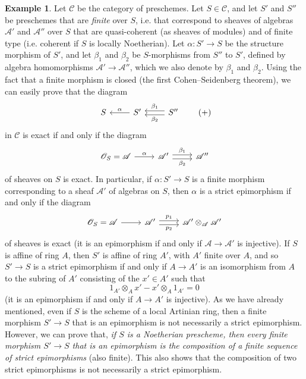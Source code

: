 \documentclass{article}
\theoremstyle{plain}
\theoremstyle{definition}
\newtheorem*{example*}{Example}
\newcommand{\sh}[1]{{\mathscr{#1}}}
\newcommand{\cat}[1]{{\mathcal{#1}}}
\newcommand{\oldpage}[1]{\marginpar{\footnotesize$\Big\vert$ \textit{p.~#1}}}
\begin{document}
\begin{example*}
  Let $\cat{C}$ be the category of preschemes.
  Let $S\in\cat{C}$, and let $S'$ and $S''$ be preschemes that are \emph{finite} over $S$, i.e. that correspond to sheaves of algebras $\sh{A}'$ and $\sh{A}''$ over $S$ that are quasi-coherent (as sheaves of modules) and of finite type (i.e. coherent if $S$ is locally Noetherian).
  Let $\alpha\colon S'\to S$ be the structure morphism of $S'$, and let $\beta_1$ and $\beta_2$ be $S$-morphisms from $S''$ to $S'$, defined by algebra homomorphisms $\sh{A}'\to\sh{A}''$, which we also denote by $\beta_1$ and $\beta_2$.
  Using the fact that a finite morphism is closed (the first Cohen--Seidenberg theorem), we can easily prove that the diagram
  \[
  \label{equation-example:A.2.b}
    \begin{tikzcd}
      S
      & S' \lar[swap,"\alpha"]
      & S'' \lar[shift left=1,"\beta_2"] \lar[shift right=1,swap,"\beta_1"]
    \end{tikzcd}
  \tag{+}
  \]
  in $\cat{C}$ is exact if and only if the diagram
\oldpage{190-08}
  \[
    \begin{tikzcd}
      \sh{O}_S = \sh{A} \rar["\alpha"]
      & \sh{A}' \rar[shift left=1,"\beta_1"] \rar[shift right=1,swap,"\beta_2"]
      & \sh{A}''
    \end{tikzcd}
  \]
  of sheaves on $S$ is exact.
  In particular, if $\alpha\colon S'\to S$ is a finite morphism corresponding to a sheaf $\sh{A}'$ of algebras on $S$, then $\alpha$ is a strict epimorphism if and only if the diagram
  \[
    \begin{tikzcd}
      \sh{O}_S = \sh{A} \rar
      & \sh{A}' \rar[shift left=1,"p_1"] \rar[shift right=1,swap,"p_2"]
      & \sh{A}'\otimes_{\sh{A}}\sh{A}'
    \end{tikzcd}
  \]
  of sheaves is exact (it is an epimorphism if and only if $\sh{A}\to\sh{A}'$ is injective).
  If $S$ is affine of ring $A$, then $S'$ is affine of ring $A'$, with $A'$ finite over $A$, and so $S'\to S$ is a strict epimorphism if and only if $A\to A'$ is an isomorphism from $A$ to the subring of $A'$ consisting of the $x'\in A'$ such that
  \[
    1_{A'}\otimes_A x' - x'\otimes_A 1_{A'} = 0
  \]
  (it is an epimorphism if and only if $A\to A'$ is injective).
  As we have already mentioned, even if $S$ is the scheme of a local Artinian ring, then a finite morphism $S'\to S$ that is an epimorphism is not necessarily a strict epimorphism.
  However, we can prove that, \emph{if $S$ is a Noetherian prescheme, then every finite morphism $S'\to S$ that is an epimorphism is the composition of a finite sequence of strict epimorphisms} (also finite).
  This also shows that the composition of two strict epimorphisms is not necessarily a strict epimorphism.
\end{example*}
\end{document}
